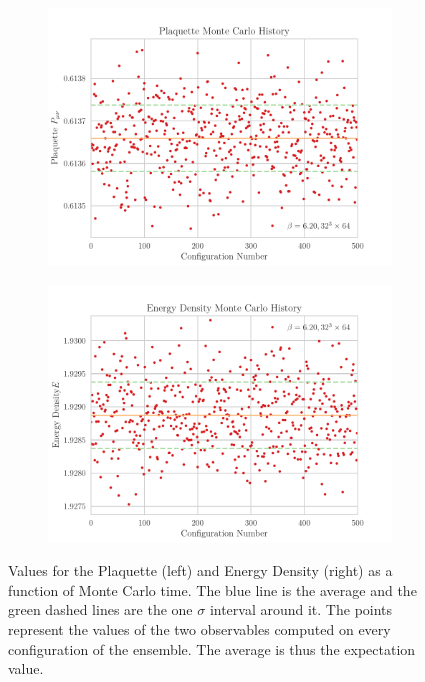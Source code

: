\begin{figure}[hbt!]
    \centering
    \begin{subfigure}{0.45\textwidth}
        \includegraphics[width=\textwidth]{results/MCPlaq.pdf}
    \end{subfigure}
    \begin{subfigure}{0.45\textwidth}
        \includegraphics[width=\textwidth]{results/MCEnrg.pdf}
    \end{subfigure}
    \caption{\footnotesize Values for the Plaquette (left) and Energy Density (right) as a function of Monte Carlo time. The blue line is the average and the green dashed lines are the one $\sigma$ interval around it. The points represent the values of the two observables computed on every configuration of the ensemble. The average is thus the expectation value.}
    \label{fig:MCPlaqEnerg}
\end{figure}   

